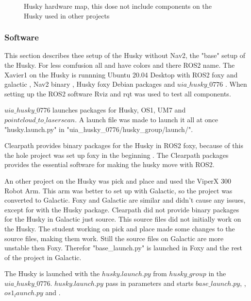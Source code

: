 \begin{figure}[H]
\begin{minipage}[b]{0.59\textwidth}
    \caption{Husky hardware map, this dose not include components on the Husky used in other projects}
    \label{fig:Husky_HW}
  \end{minipage}
\end{figure}
\subsubsection{Software}
This section describes thee setup of the Husky without Nav2, the "base" setup of the Husky. For less comfusion all  and  have colors and there ROS2 name. 
The Xavier1 on the Husky is runnning Ubuntu 20.04 Desktop \cite{ubuntu20_04} with ROS2 foxy \cite{rosfoxyinstall} and galactic \cite{rosgalacticinstall}, Nav2 binary \cite{rosnavinstall}, Husky foxy Debian packages \cite{huskyinstall} and $uia\_husky\_0776$ \cite{uiahusky}. When setting up the ROS2 software Rviz and rqt was used to test all components. \newline
    
$uia\_husky\_0776$ launches packages for Husky, OS1, UM7 and $pointcloud\_to\_laserscan$. A launch file was made to launch it all at once "husky.launch.py" in "uia\_husky\_0776/husky\_group/launch/".


Clearpath provides binary packages for the Husky in ROS2 foxy, because of this the hole project was set up foxy in the beginning . The Clearpath packages provides the essential software for making the husky move with ROS2.

An other project on the Husky was pick and place and used the ViperX 300 Robot Arm. This arm was better to set up with Galactic, so the project was converted to Galactic. Foxy and Galactic are similar and didn't cause any issues, except for with the Husky package. Clearpath did not provide binary packages for the Husky in Galactic just source. This source files did not initially work on the Husky. The student working on pick and place made some changes to the source files, making them work. Still the source files on Galactic are more unstable then Foxy. Therefor "base\_launch.py" is launched in Foxy and the rest of the project in Galactic. 

The Husky is launched with the $husky.launch.py$ from $husky\_group$ in the $uia\_husky\_0776$. $husky.launch.py$ pass in parameters and starts $base\_launch.py$, , $os1_launch.py$ and . 

